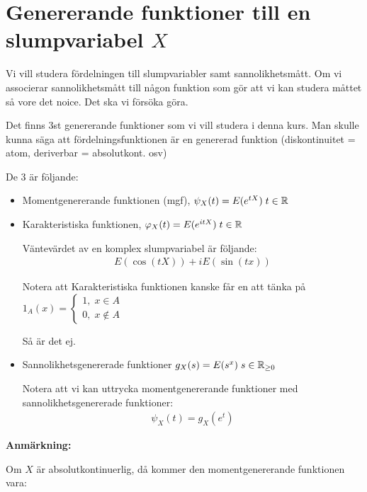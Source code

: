 \section{Genererande funktioner till en slumpvariabel $X$}\par
\noindent Vi vill studera fördelningen till slumpvariabler samt sannolikhetsmått. Om vi associerar sannolikhetsmått till någon funktion som gör att vi kan studera måttet så vore det noice. Det ska vi försöka göra.
\par\bigskip
\noindent Det finns 3st genererande funktioner som vi vill studera i denna kurs. Man skulle kunna säga att fördelningsfunktionen är en genererad funktion (diskontinuitet = atom, deriverbar = absolutkont. osv) 
\par\bigskip
\noindent De 3 är följande:
\begin{itemize}
  \item Momentgenererande funktionen (mgf), $\psi_X(t) = E(e^{tX})\;t\in\mathbb{R}$
  \item Karakteristiska funktionen, $\varphi_X(t) = E(e^{itX})\;t\in\mathbb{R}$\par
    Väntevärdet av en komplex slumpvariabel är följande:
    \begin{equation*}
      \begin{gathered}
        E(\cos(tX))+iE(\sin(tx))
      \end{gathered}
    \end{equation*}
    \par
  Notera att Karakteristiska funktionen kanske får en att tänka på $1_A(x) = \begin{cases}1,\;x\in A\\0,\; x\notin A\end{cases}$\par
  Så är det ej.
  \par\bigskip
\item Sannolikhetsgenererade funktioner $g_X(s) = E(s^x)\;s\in\mathbb{R}_{\geq0}$\par
  Notera att vi kan uttrycka momentgenererande funktioner med sannolikhetsgenererade funktioner:
  \begin{equation*}
    \begin{gathered}
      \psi_X(t) = g_X(e^t)
    \end{gathered}
  \end{equation*}
\end{itemize}
\par\bigskip
\noindent\textbf{Anmärkning:}\par
\noindent Om $X$ är absolutkontinuerlig, då kommer den momentgenererande funktionen vara:
